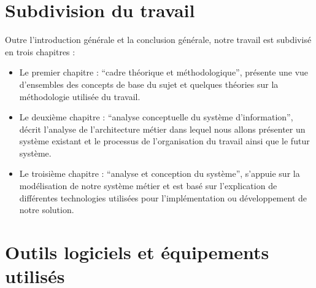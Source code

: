     \section[Subdivision du travail]{Subdivision du travail}
    Outre l’introduction générale et la conclusion générale, notre travail est subdivisé
    en trois chapitres :
    \newline
        \begin{itemize}
            \item [\ding{226}] Le premier chapitre : \enquote{cadre théorique et méthodologique}, présente une vue
            d’ensembles des concepts de base du sujet et quelques théories sur la méthodologie
            utilisée du travail.
            \newline
            \item [\ding{226}] Le deuxième chapitre : \enquote{analyse conceptuelle du système d’information}, 
            décrit l’analyse de l’architecture métier dans lequel nous allons présenter un système existant
            et le processus de l’organisation du travail ainsi que le futur système.
            \newline       
            \item [\ding{226}] Le troisième chapitre : \enquote{analyse et conception du système}, s’appuie sur la
            modélisation de notre système métier et est basé sur l’explication de différentes
            technologies utilisées pour l’implémentation ou développement de notre solution.            
        \end{itemize} 
    \section[Outils logiciels et équipements utilisés]{Outils logiciels et équipements utilisés}